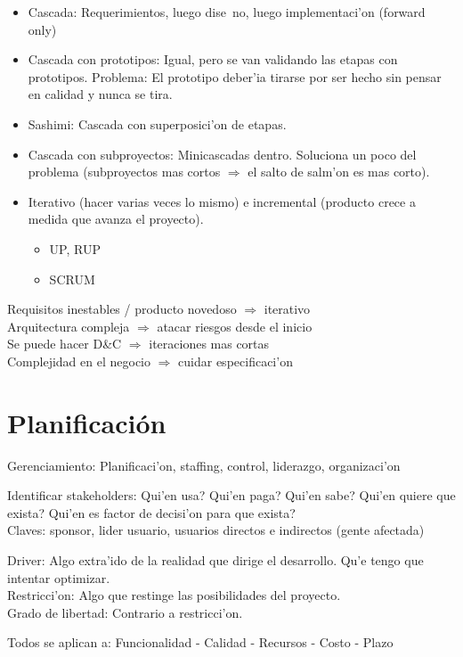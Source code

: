 \documentclass[a4paper,spanish]{article}
\newcommand{\tab}[0]{\hspace*{0.5cm}}
\begin{document}
\begin{itemize}
\item Cascada: Requerimientos, luego dise~no, luego implementaci'on 
	(forward only)
\item Cascada con prototipos: Igual, pero se van validando las etapas con
	prototipos. Problema: El prototipo deber'ia tirarse por ser hecho sin
	pensar en calidad y nunca se tira.
\item Sashimi: Cascada con superposici'on de etapas.
\item Cascada con subproyectos: Minicascadas dentro. Soluciona un poco del 
	problema (subproyectos mas cortos $\Rightarrow$ el salto de salm'on es mas 
	corto).
\item Iterativo (hacer varias veces lo mismo) e incremental (producto crece a
	medida que avanza el proyecto).
\begin{itemize}
\item UP, RUP
\item SCRUM
\end{itemize}
\end{itemize}

Requisitos inestables / producto novedoso $\Rightarrow$ iterativo \\
Arquitectura compleja $\Rightarrow$ atacar riesgos desde el inicio \\
Se puede hacer D\&C $\Rightarrow$ iteraciones mas cortas \\
Complejidad en el negocio $\Rightarrow$ cuidar especificaci'on

\section{Planificaci\'on}

Gerenciamiento: Planificaci'on, staffing, control, liderazgo, organizaci'on

Identificar stakeholders: Qui'en usa? Qui'en paga? Qui'en sabe? Qui'en quiere
	que exista? Qui'en es factor de decisi'on para que exista? \\
\tab Claves: sponsor, lider usuario, usuarios directos e indirectos (gente 
	afectada)

Driver: Algo extra'ido de la realidad que dirige el desarrollo. Qu'e tengo
	que intentar optimizar. \\
Restricci'on: Algo que restinge las posibilidades del proyecto. \\
Grado de libertad: Contrario a restricci'on.

Todos se aplican a: Funcionalidad - Calidad - Recursos - Costo - Plazo
\end{document}
